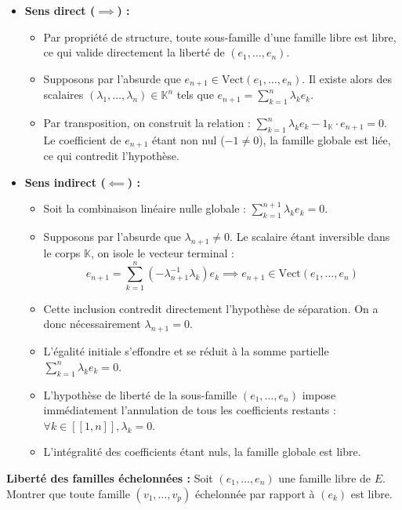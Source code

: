 \documentclass[11pt, a4paper]{article}
\theoremstyle{definition}
\begin{document}
\begin{itemize}
\item \textbf{Sens direct ($\implies$) :}
\begin{itemize}
\item Par propriété de structure, toute sous-famille d'une famille libre est libre, ce qui valide directement la liberté de $(e_1, \dots, e_n)$.
\item Supposons par l'absurde que $e_{n+1} \in \text{Vect}(e_1, \dots, e_n)$. Il existe alors des scalaires $(\lambda_1, \dots, \lambda_n) \in \mathbb{K}^n$ tels que $e_{n+1} = \sum_{k=1}^n \lambda_k e_k$.
\item Par transposition, on construit la relation : $\sum_{k=1}^n \lambda_k e_k - 1_{\mathbb{K}} \cdot e_{n+1} = 0$. Le coefficient de $e_{n+1}$ étant non nul ($-1 \neq 0$), la famille globale est liée, ce qui contredit l'hypothèse.
\end{itemize}
\item \textbf{Sens indirect ($\impliedby$) :}
\begin{itemize}
\item Soit la combinaison linéaire nulle globale : $\sum_{k=1}^{n+1} \lambda_k e_k = 0$.
\item Supposons par l'absurde que $\lambda_{n+1} \neq 0$. Le scalaire étant inversible dans le corps $\mathbb{K}$, on isole le vecteur terminal :
\[
e_{n+1} = \sum_{k=1}^n \left(-\lambda_{n+1}^{-1} \lambda_k\right) e_k \implies e_{n+1} \in \text{Vect}(e_1, \dots, e_n)
\]
\item Cette inclusion contredit directement l'hypothèse de séparation. On a donc nécessairement $\lambda_{n+1} = 0$.
\item L'égalité initiale s'effondre et se réduit à la somme partielle $\sum_{k=1}^n \lambda_k e_k = 0$.
\item L'hypothèse de liberté de la sous-famille $(e_1, \dots, e_n)$ impose immédiatement l'annulation de tous les coefficients restants : $\forall k \in [\![1, n]\!], \lambda_k = 0$.
\item L'intégralité des coefficients étant nuls, la famille globale est libre.
\end{itemize}
\end{itemize}

\clearpage

\begin{tcolorbox}[instructionstyle]
\textbf{Liberté des familles échelonnées :} Soit $(e_1, \dots, e_n)$ une famille libre de $E$. Montrer que toute famille $(v_1, \dots, v_p)$ échelonnée par rapport à $(e_k)$ est libre.
\end{tcolorbox}
\end{document}
